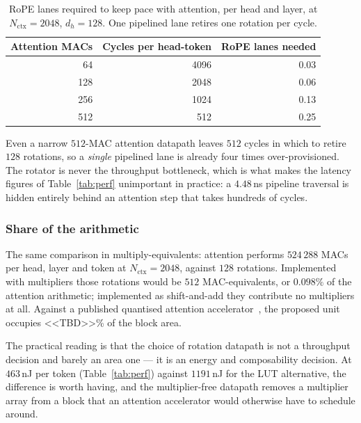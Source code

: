 \begin{table}[t]
\caption{RoPE lanes required to keep pace with attention, per head and layer,
at $N_{\mathrm{ctx}} = 2048$, $d_h = 128$. One pipelined lane retires one
rotation per cycle.}
\label{tab:budget}
\centering
\begin{tabular}{rrr}
\toprule
Attention MACs & Cycles per head-token & RoPE lanes needed \\
\midrule
64  & 4096 & 0.03 \\
128 & 2048 & 0.06 \\
256 & 1024 & 0.13 \\
512 & 512  & 0.25 \\
\bottomrule
\end{tabular}
\end{table}

Even a narrow $512$-MAC attention datapath leaves $512$ cycles in which to
retire $128$ rotations, so a \emph{single} pipelined lane is already four
times over-provisioned. The rotator is never the throughput bottleneck, which
is what makes the latency figures of Table~\ref{tab:perf} unimportant in
practice: a $4.48$\,ns pipeline traversal is hidden entirely behind an
attention step that takes hundreds of cycles.

\subsubsection{Share of the arithmetic}
The same comparison in multiply-equivalents: attention performs
$524\,288$ MACs per head, layer and token at $N_{\text{ctx}} = 2048$, against
$128$ rotations. Implemented with multipliers those rotations would be $512$
MAC-equivalents, or $0.098\%$ of the attention arithmetic; implemented as
shift-and-add they contribute no multipliers at all. Against a published
quantised attention accelerator~\cite{c8}, the proposed unit occupies
<<TBD>>\% of the block area.

The practical reading is that the choice of rotation datapath is not a
throughput decision and barely an area one --- it is an energy and
composability decision. At $463$\,nJ per token (Table~\ref{tab:perf}) against
$1191$\,nJ for the LUT alternative, the difference is worth having, and the
multiplier-free datapath removes a multiplier array from a block that an
attention accelerator would otherwise have to schedule around.
